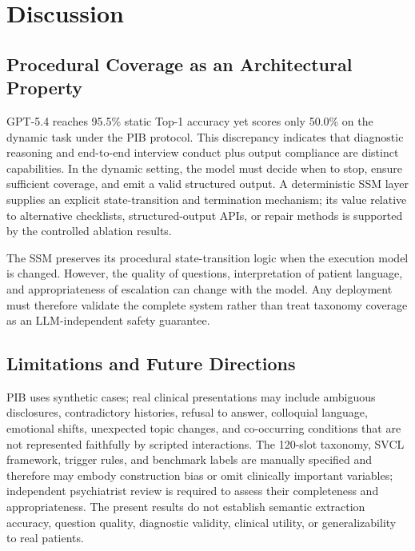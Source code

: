 \documentclass[conference]{IEEEtran}
\begin{document}
\section{Discussion}

\subsection{Procedural Coverage as an Architectural Property}

GPT-5.4 reaches 95.5\% static Top-1 accuracy yet scores only 50.0\% on the dynamic task under the PIB protocol. This discrepancy indicates that diagnostic reasoning and end-to-end interview conduct plus output compliance are distinct capabilities. In the dynamic setting, the model must decide when to stop, ensure sufficient coverage, and emit a valid structured output. A deterministic SSM layer supplies an explicit state-transition and termination mechanism; its value relative to alternative checklists, structured-output APIs, or repair methods is supported by the controlled ablation results.

The SSM preserves its procedural state-transition logic when the execution model is changed. However, the quality of questions, interpretation of patient language, and appropriateness of escalation can change with the model. Any deployment must therefore validate the complete system rather than treat taxonomy coverage as an LLM-independent safety guarantee.

\subsection{Limitations and Future Directions}

PIB uses synthetic cases; real clinical presentations may include ambiguous disclosures, contradictory histories, refusal to answer, colloquial language, emotional shifts, unexpected topic changes, and co-occurring conditions that are not represented faithfully by scripted interactions. The 120-slot taxonomy, SVCL framework, trigger rules, and benchmark labels are manually specified and therefore may embody construction bias or omit clinically important variables; independent psychiatrist review is required to assess their completeness and appropriateness. The present results do not establish semantic extraction accuracy, question quality, diagnostic validity, clinical utility, or generalizability to real patients.
\end{document}
